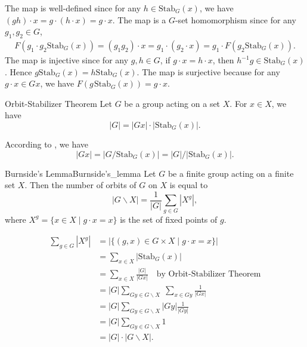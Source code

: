 \begin{prf}
    The map is well-defined since for any $h\in \mathrm{Stab}_G(x)$, we have $(gh)\cdot x=g\cdot (h\cdot x)=g\cdot x$. The map is a $G$-set homomorphism since for any $g_1,g_2\in G$,
    \begin{align*}
        F\left(g_1\cdot g_2\mathrm{Stab}_G(x)\right)=(g_1g_2)\cdot x=g_1\cdot(g_2\cdot x)=g_1\cdot F\left(g_2\mathrm{Stab}_G(x)\right).
    \end{align*}
    The map is injective since for any $g,h\in G$, if $g\cdot x=h\cdot x$, then $h^{-1}g\in \mathrm{Stab}_G(x)$. Hence $g\mathrm{Stab}_G(x)=h\mathrm{Stab}_G(x)$. The map is surjective because for any $g\cdot x\in Gx$, we have $F\left(g\hspace{1pt}\mathrm{Stab}_G(x)\right)=g\cdot x$.
\end{prf}

\begin{theorem}{Orbit-Stabilizer Theorem}{}
    Let $G$ be a group acting on a set $X$. For $x\in X$, we have
    \[
        |G|=|Gx|\cdot |\mathrm{Stab}_G(x)|    .
    \]
\end{theorem}

\begin{prf}
    According to , we have
    \[
        \left|Gx\right|=\left|G/\mathrm{Stab}_G(x)\right|=|G|/\left|\mathrm{Stab}_G(x)\right|.
    \]
\end{prf}

\begin{theorem}{Burnside's Lemma}{Burnside's_lemma}
    Let $G$ be a finite group acting on a finite set $X$. Then the number of orbits of $G$ on $X$ is equal to
    \[
        |G\backslash X|=\frac{1}{|G|}\sum_{g\in G}|X^g|    ,
    \]
    where $X^g=\{x\in X\mid g\cdot x=x\}$ is the set of fixed points of $g$.
\end{theorem}

\begin{prf}
    \begin{align*}
        \sum_{g \in G}\left|X^g\right| & =|\{(g, x) \in G \times X \mid g \cdot x=x\}|                                        \\
                                       & =\sum_{x \in X}\left|\mathrm{Stab}_G(x)\right|                                       \\
                                       & =\sum_{x \in X}\frac{|G|}{\left|G x\right|} \quad \text{by Orbit-Stabilizer Theorem} \\
                                       & =|G| \sum_{G y \in G \backslash X}\; \sum_{x \in Gy}\frac{1}{\left|G x\right|}       \\
                                       & =|G| \sum_{G y \in G \backslash X} \left|Gy\right|\frac{1}{\left|G y\right|}         \\
                                       & =|G| \sum_{G y \in G \backslash X} 1                                                 \\
                                       & =|G| \cdot|G \backslash X|.
    \end{align*}

\end{prf}




